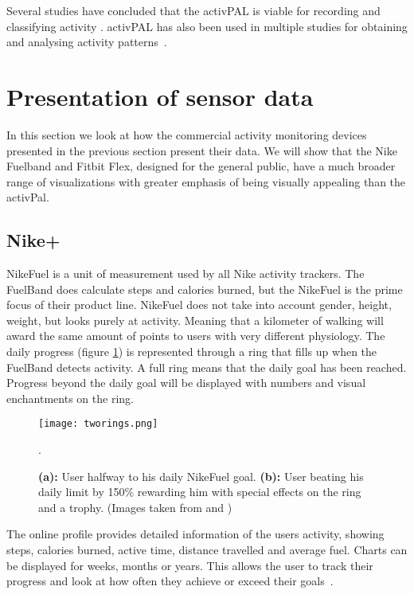Several studies have concluded that the activPAL is viable for recording and classifying activity \cite{grant2006, ryan2006, grant2008, tsavourelou}. activPAL has also been used in multiple studies for obtaining and analysing activity patterns~\cite{grant2010, lord, ryan2010}.

\section{Presentation of sensor data}
In this section we look at how the commercial activity monitoring devices presented in the previous section present their data. We will show that the Nike Fuelband and Fitbit Flex, designed for the general public, have a much broader range of visualizations with greater emphasis of being visually appealing than the activPal.

\subsection{Nike+}
NikeFuel \cite{nikefuel} is a unit of measurement used by all Nike activity trackers. The FuelBand does calculate steps and calories burned, but the NikeFuel is the prime focus of their product line. NikeFuel does not take into account gender, height, weight, but looks purely at activity. Meaning that a kilometer of walking will award the same amount of points to users with very different physiology. The daily progress (figure \ref{fig:tworings}) is represented through a ring that fills up when the FuelBand detects activity. A full ring means that the daily goal has been reached. Progress beyond the daily goal will be displayed with numbers and visual enchantments on the ring. 

\begin{figure}[h!]
	\centering
		\texttt{[image: tworings.png]}
		\caption{\footnotesize \textbf{(a):} User halfway to his daily NikeFuel goal. \textbf{(b):} User beating his daily limit by 150\% rewarding him with special effects on the ring and a trophy. (Images taken from \cite{fuelbandDcRain} and \cite{fuelbandTechSpce})}.
		\label{fig:tworings}
\end{figure}

The online profile provides detailed information of the users activity, showing steps, calories burned, active time, distance travelled and average fuel. Charts can be displayed for weeks, months or years. This allows the user to track their progress and look at how often they achieve or exceed their goals~\cite{fuelbandTechSpce}. 

